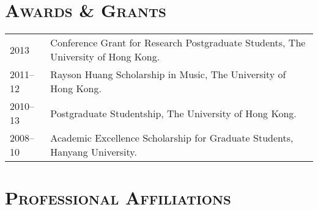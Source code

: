 \documentclass[a4paper,11pt]{article}
\begin{document}
  \vspace{2.5mm}
  
  \section*{\textsc{Awards \& Grants}}
  
  \hspace*{-0.25cm}
  \begin{tabular}{p{2.5cm} l}
    2013 & Conference Grant for Research Postgraduate Students, The University of Hong Kong.\\
    2011–12 & Rayson Huang Scholarship in Music, The University of Hong Kong.\\
    2010–13 & Postgraduate Studentship, The University of Hong Kong.\\
    2008–10 & Academic Excellence Scholarship for Graduate Students, Hanyang University.
  \end{tabular}
  
  \vspace{2.5mm}
  
%  
%    
%  
  
%  
%  
  \section*{\textsc{Professional Affiliations}}
  
\end{document}
